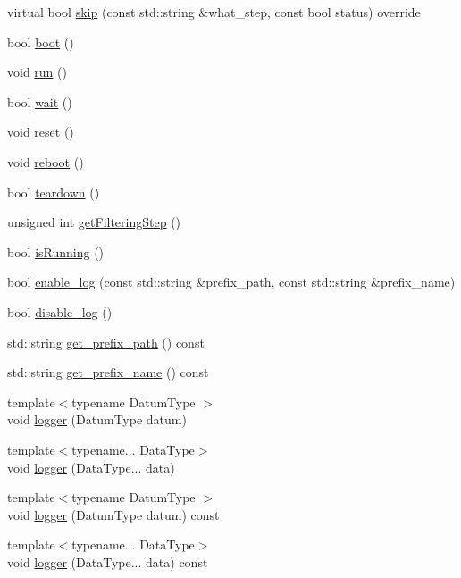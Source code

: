 \begin{DoxyCompactItemize}
\item 
virtual bool \mbox{\hyperlink{classbfl_1_1ParticleFilter_a2d7a5e7aaad179037273d35be229056d}{skip}} (const std\+::string \&what\+\_\+step, const bool status) override
\item 
bool \mbox{\hyperlink{classbfl_1_1FilteringAlgorithm_a96651f8464190c0a56d79219a1017147}{boot}} ()
\item 
void \mbox{\hyperlink{classbfl_1_1FilteringAlgorithm_a009cbe5f4bbb16967f6c6ddcaed8fbb1}{run}} ()
\item 
bool \mbox{\hyperlink{classbfl_1_1FilteringAlgorithm_a40372c24fa050eb0274371172df0a244}{wait}} ()
\item 
void \mbox{\hyperlink{classbfl_1_1FilteringAlgorithm_a2403c62fbd7bd7f5cda56a84f5f30331}{reset}} ()
\item 
void \mbox{\hyperlink{classbfl_1_1FilteringAlgorithm_a6022859aa985474fb997343cc935b11e}{reboot}} ()
\item 
bool \mbox{\hyperlink{classbfl_1_1FilteringAlgorithm_a1dc912d89ee8f96d4f3e8209865c5308}{teardown}} ()
\item 
unsigned int \mbox{\hyperlink{classbfl_1_1FilteringAlgorithm_a8c43b1f3dac30934c0a03de348d4a29d}{get\+Filtering\+Step}} ()
\item 
bool \mbox{\hyperlink{classbfl_1_1FilteringAlgorithm_a5cfecab2c778620e2557237472bb1721}{is\+Running}} ()
\item 
bool \mbox{\hyperlink{classbfl_1_1Logger_ae94b97b6e8d7902e8ce048384813122e}{enable\+\_\+log}} (const std\+::string \&prefix\+\_\+path, const std\+::string \&prefix\+\_\+name)
\item 
bool \mbox{\hyperlink{classbfl_1_1Logger_a440467a28ccc46490d767fe0ef6f556a}{disable\+\_\+log}} ()
\item 
std\+::string \mbox{\hyperlink{classbfl_1_1Logger_a56cf1a4e712bf23d9978420a8a59a62b}{get\+\_\+prefix\+\_\+path}} () const
\item 
std\+::string \mbox{\hyperlink{classbfl_1_1Logger_a913a795b7bfbf378815eeb342d68a7c0}{get\+\_\+prefix\+\_\+name}} () const
\item 
{\footnotesize template$<$typename Datum\+Type $>$ }\\void \mbox{\hyperlink{classbfl_1_1Logger_a1033ff31398484f2132f84fd140da9e3}{logger}} (Datum\+Type datum)
\item 
{\footnotesize template$<$typename... Data\+Type$>$ }\\void \mbox{\hyperlink{classbfl_1_1Logger_aca2086c9256e5c404872b91f7f25b97d}{logger}} (Data\+Type... data)
\item 
{\footnotesize template$<$typename Datum\+Type $>$ }\\void \mbox{\hyperlink{classbfl_1_1Logger_a50b1c109730fa98f66e66f420f0158fe}{logger}} (Datum\+Type datum) const
\item 
{\footnotesize template$<$typename... Data\+Type$>$ }\\void \mbox{\hyperlink{classbfl_1_1Logger_a0f0cf7ce956546d94dfb1feb7cebf171}{logger}} (Data\+Type... data) const
\end{DoxyCompactItemize}
